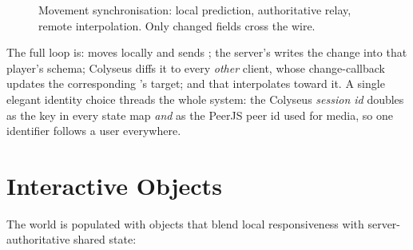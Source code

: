 \begin{figure}[htbp]
\centering
{}
\caption{Movement synchronisation: local prediction, authoritative relay, remote
interpolation. Only changed fields cross the wire.}
\label{fig:sky-sync}
\end{figure}

The full loop is:  moves locally and sends ;
the server's  writes the change into that player's
schema; Colyseus diffs it to every \emph{other} client, whose change-callback
updates the corresponding 's target; and that 
interpolates toward it. A single elegant identity choice threads the whole system:
the Colyseus \emph{session id} doubles as the key in every state map \emph{and} as
the PeerJS peer id used for media, so one identifier follows a user everywhere.

\section{Interactive Objects}

The world is populated with objects that blend local responsiveness with
server-authoritative shared state:

